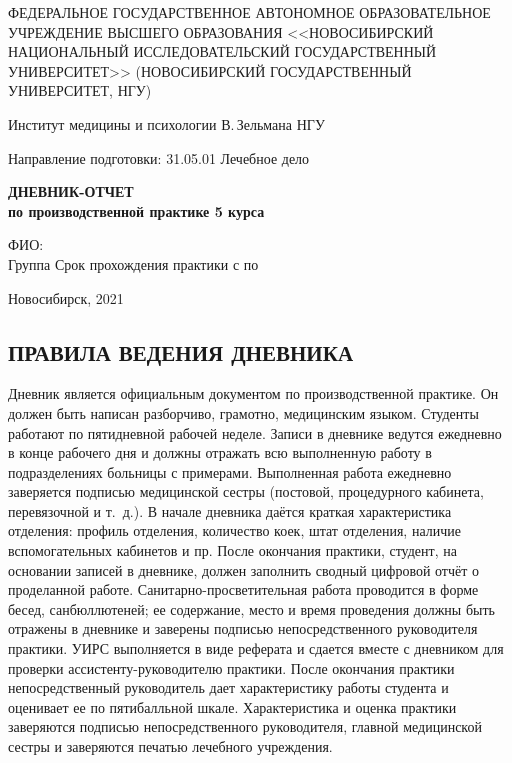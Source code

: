 \documentclass[a4paper,12pt]{extarticle}
\begin{document}
\begin{titlepage}
	\centering
	{\par\small{ФЕДЕРАЛЬНОЕ ГОСУДАРСТВЕННОЕ АВТОНОМНОЕ ОБРАЗОВАТЕЛЬНОЕ УЧРЕЖДЕНИЕ ВЫСШЕГО ОБРАЗОВАНИЯ <<НОВОСИБИРСКИЙ НАЦИОНАЛЬНЫЙ ИССЛЕДОВАТЕЛЬСКИЙ ГОСУДАРСТВЕННЫЙ УНИВЕРСИТЕТ>> (НОВОСИБИРСКИЙ ГОСУДАРСТВЕННЫЙ УНИВЕРСИТЕТ, НГУ)}}
	{\par\small{Институт медицины и психологии В.\,Зельмана НГУ}}
	{\par\small{Направление подготовки: 31.05.01 Лечебное дело}}

	\vspace{5cm}

	{\par\Large\textbf{ДНЕВНИК-ОТЧЕТ\\по производственной практике 5 курса}}

	\vspace{0.5cm}

	ФИО: \hrulefill\\
	Группа \hrulefill Срок прохождения практики с \hrulefill по \hrulefill

	\vfill

	{\centering\small{Новосибирск, 2021}}
\end{titlepage}

\newpage

\subsection*{ПРАВИЛА ВЕДЕНИЯ ДНЕВНИКА}

Дневник является официальным документом по производственной практике. 
Он должен быть написан разборчиво, грамотно, медицинским языком.
Студенты работают по пятидневной рабочей неделе.
Записи в дневнике ведутся ежедневно в конце рабочего дня и должны отражать всю 
выполненную работу в подразделениях больницы с примерами.
Выполненная работа ежедневно заверяется подписью медицинской сестры (постовой, процедурного кабинета, перевязочной и т.~д.).
В начале дневника даётся краткая характеристика отделения: профиль отделения, количество коек, штат отделения, наличие вспомогательных кабинетов и пр.
После окончания практики, студент, на основании записей в дневнике, должен заполнить сводный цифровой отчёт о проделанной работе.
Санитарно\hyp{}просветительная работа проводится в форме бесед, санбюллютеней;
ее содержание, место и время проведения должны быть отражены в дневнике и заверены подписью непосредственного руководителя практики.
УИРС выполняется в виде реферата и сдается вместе с дневником для проверки ассистенту\hyp{}руководителю практики.
После окончания практики непосредственный руководитель дает характеристику работы студента и оценивает ее по пятибалльной шкале. 
Характеристика и оценка практики заверяются подписью непосредственного руководителя, главной медицинской сестры и заверяются печатью лечебного учреждения.
\end{document}
